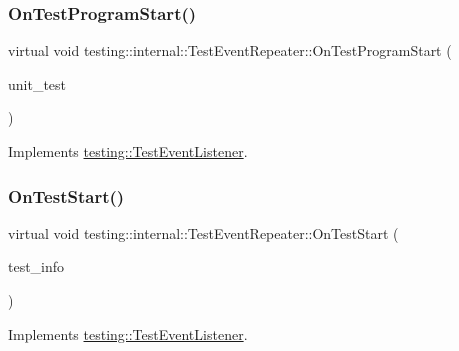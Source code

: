 \subsubsection{\texorpdfstring{On\+Test\+Program\+Start()}{OnTestProgramStart()}}
{\footnotesize\ttfamily virtual void testing\+::internal\+::\+Test\+Event\+Repeater\+::\+On\+Test\+Program\+Start (\begin{DoxyParamCaption}\item[{const \hyperlink{classtesting_1_1_unit_test}{Unit\+Test} \&}]{unit\+\_\+test }\end{DoxyParamCaption})\hspace{0.3cm}{\ttfamily [virtual]}}



Implements \hyperlink{classtesting_1_1_test_event_listener_a5f6c84f39851e8a603a2d2e10063816b}{testing\+::\+Test\+Event\+Listener}.

\mbox{\label{classtesting_1_1internal_1_1_test_event_repeater_a70d694ca5010cc86cd458f7f529e6fbe}} 
\subsubsection{\texorpdfstring{On\+Test\+Start()}{OnTestStart()}}
{\footnotesize\ttfamily virtual void testing\+::internal\+::\+Test\+Event\+Repeater\+::\+On\+Test\+Start (\begin{DoxyParamCaption}\item[{const \hyperlink{classtesting_1_1_test_info}{Test\+Info} \&}]{test\+\_\+info }\end{DoxyParamCaption})\hspace{0.3cm}{\ttfamily [virtual]}}



Implements \hyperlink{classtesting_1_1_test_event_listener_ab4f6a0ca16ae75daf385b3b5914e1048}{testing\+::\+Test\+Event\+Listener}.

\mbox{\label{classtesting_1_1internal_1_1_test_event_repeater_ac77a3d127e4726e11694e4ee9cf3b793}} 
